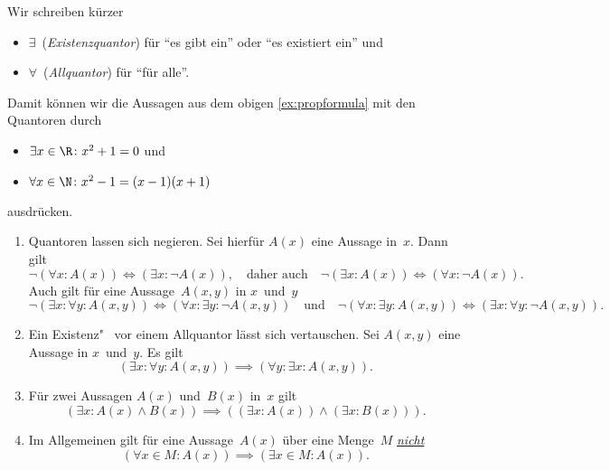 \documentclass[a4paper]{article}
\begin{document}
\begin{notation}[Quantoren]
    Wir schreiben kürzer
    \begin{itemize}
        \item $\exists$~(\emph{Existenzquantor}) für "`es gibt ein"' oder "`es existiert ein"' und
        \item $\forall$~(\emph{Allquantor}) für "`für alle"'.
    \end{itemize}
\end{notation}

Damit können wir die Aussagen aus dem obigen \cref{ex:propformula} mit den Quantoren durch
\begin{itemize}
    \item $\exists x \in \R\colon x^2 + 1 = 0$ und
    \item $\forall x \in \N\colon x^2 - 1 = (x - 1) (x + 1)$
\end{itemize}
ausdrücken.

\begin{theorem}\leavevmode
    \begin{enumerate}
        \item Quantoren lassen sich negieren. Sei hierfür $A(x)$ eine Aussage in~$x$. Dann gilt
              \begin{equation*}
                  \neg (\forall x\colon A(x)) \iff (\exists x\colon \neg A(x)), \quad\text{daher auch}\quad \neg (\exists x\colon A(x)) \iff (\forall x\colon \neg A(x)).
              \end{equation*}
              Auch gilt für eine Aussage~$A(x, y)$ in $x$~und~$y$
              \begin{equation*}
                  \neg (\exists x\colon \forall y\colon A(x, y)) \iff (\forall x\colon \exists y\colon \neg A(x, y)) \quad\text{und}\quad \neg (\forall x\colon \exists y\colon A(x, y)) \iff (\exists x\colon \forall y\colon \neg A(x, y)).
              \end{equation*}
        \item Ein Existenz"~ vor einem Allquantor lässt sich vertauschen. Sei $A(x, y)$ eine Aussage in $x$~und~$y$. Es gilt
              \begin{equation*}
                  (\exists x\colon \forall y\colon A(x, y)) \implies (\forall y\colon \exists x\colon A(x, y)).
              \end{equation*}
        \item Für zwei Aussagen $A(x)$ und~$B(x)$ in~$x$ gilt
              \begin{equation*}
                  (\exists x\colon A(x) \wedge B(x)) \implies ((\exists x\colon A(x)) \wedge (\exists x\colon B(x))).
              \end{equation*}
        \item Im Allgemeinen gilt für eine Aussage~$A(x)$ über eine Menge~$M$ \underline{\emph{nicht}}
              \begin{equation*}
                  (\forall x \in M\colon A(x)) \implies (\exists x \in M\colon A(x)).
              \end{equation*}
    \end{enumerate}
\end{theorem}
\end{document}
